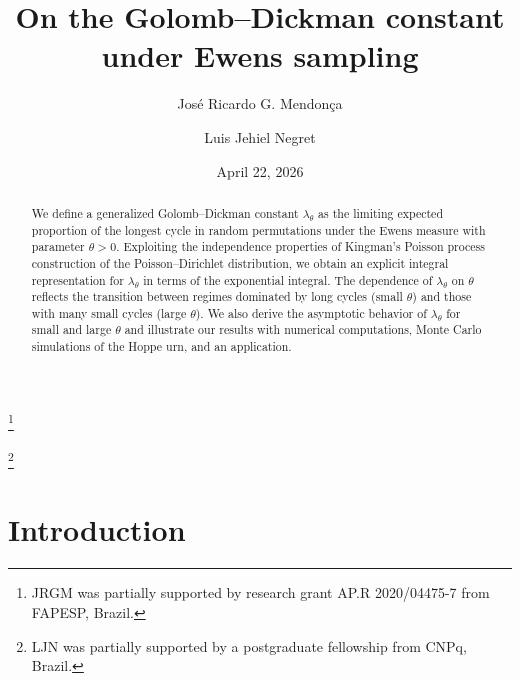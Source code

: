 \documentclass{amsart}
\theoremstyle{definition}
\theoremstyle{remark}
\numberwithin{equation}{section}
\begin{document}
\title[On the Golomb--Dickman constant under Ewens sampling]{On the Golomb--Dickman constant \\ under Ewens sampling}

\author[J. R. G. Mendon\c{c}a]{Jos\'{e} Ricardo G. Mendon\c{c}a}
\address{Escola de Artes, Ci\^{e}ncias e Humanidades, Universidade de S\~{a}o Paulo, SP, Brazil.}
\thanks{JRGM was partially supported by research grant AP.R 2020/04475-7 from FAPESP, Brazil.}

\author[L. J. Negret]{Luis Jehiel Negret}
\address{Instituto de Matemática e Estat\'{\i}stica, Universidade de S\~{a}o Paulo, SP, Brazil}
\thanks{LJN was partially supported by a postgraduate fellowship from CNPq, Brazil.}



\date{April 22, 2026}

\begin{abstract}
We define a generalized Golomb--Dickman constant $\lambda_{\theta}$ as the limiting expected proportion of the longest cycle in random permutations under the Ewens measure with parameter $\theta > 0$. Exploiting the independence properties of Kingman's Poisson process construction of the Poisson--Dirichlet distribution, we obtain an explicit integral representation for $\lambda_{\theta}$ in terms of the exponential integral. The dependence of $\lambda_{\theta}$ on $\theta$ reflects the transition between regimes dominated by long cycles (small $\theta$) and those with many small cycles (large $\theta$). We also derive the asymptotic behavior of $\lambda_{\theta}$ for small and large $\theta$ and illustrate our results with numerical computations, Monte Carlo simulations of the Hoppe urn, and an application.
\end{abstract}

\maketitle


\section{Introduction}
\label{sec:intro}
\end{document}
